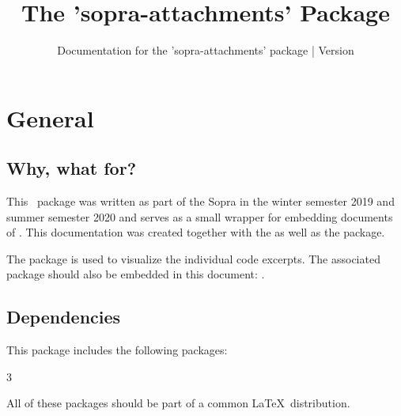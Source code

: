 \documentclass{sopra-base}
\title{The 'sopra-attachments' Package}
\subtitle[Documentation for the 'sopra-attachments' package]{Documentation for the 'sopra-attachments' package | Version \thesoaversion}
\begin{document}
    \maketitle

\section{General}
\subsection{Why, what for?}
    This \LaTeXe\ package was written as part of the Sopra in the
    winter semester 2019 and summer semester 2020 and serves as a
    small wrapper for embedding documents
    of . This documentation was created together with the
     as well as the  package.\par
    The  package is used to visualize the individual code
    excerpts.
    The associated package should also be embedded in this document: .
\subsection{Dependencies}
    This package includes the following packages:
    \begin{multicols}{3}
    \end{multicols}
    All of these packages should be part of a common \LaTeX\ distribution.
\end{document}
